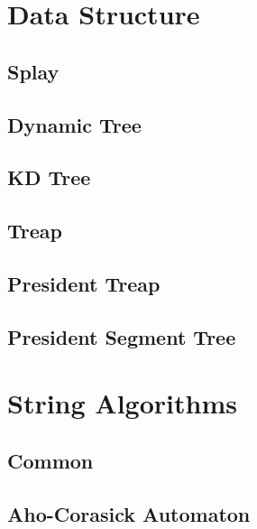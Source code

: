 \documentclass[10pt]{article}
\begin{document}
\tableofcontents
\newpage

\section{Data Structure}
\subsection{Splay}

\subsection{Dynamic Tree}

\subsection{KD Tree}

\subsection{Treap}

\subsection{President Treap}

\subsection{President Segment Tree}

\section{String Algorithms}
\subsection{Common}



\subsection{Aho-Corasick Automaton}

\end{document}
